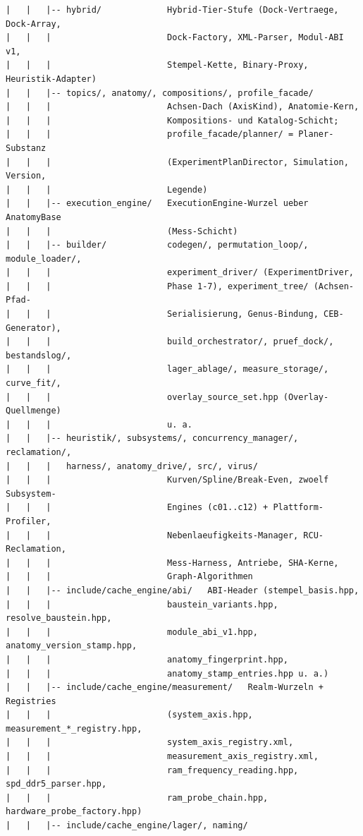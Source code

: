 {\begin{verbatim}
|   |   |-- hybrid/             Hybrid-Tier-Stufe (Dock-Vertraege, Dock-Array,
|   |   |                       Dock-Factory, XML-Parser, Modul-ABI v1,
|   |   |                       Stempel-Kette, Binary-Proxy, Heuristik-Adapter)
|   |   |-- topics/, anatomy/, compositions/, profile_facade/
|   |   |                       Achsen-Dach (AxisKind), Anatomie-Kern,
|   |   |                       Kompositions- und Katalog-Schicht;
|   |   |                       profile_facade/planner/ = Planer-Substanz
|   |   |                       (ExperimentPlanDirector, Simulation, Version,
|   |   |                       Legende)
|   |   |-- execution_engine/   ExecutionEngine-Wurzel ueber AnatomyBase
|   |   |                       (Mess-Schicht)
|   |   |-- builder/            codegen/, permutation_loop/, module_loader/,
|   |   |                       experiment_driver/ (ExperimentDriver,
|   |   |                       Phase 1-7), experiment_tree/ (Achsen-Pfad-
|   |   |                       Serialisierung, Genus-Bindung, CEB-Generator),
|   |   |                       build_orchestrator/, pruef_dock/, bestandslog/,
|   |   |                       lager_ablage/, measure_storage/, curve_fit/,
|   |   |                       overlay_source_set.hpp (Overlay-Quellmenge)
|   |   |                       u. a.
|   |   |-- heuristik/, subsystems/, concurrency_manager/, reclamation/,
|   |   |   harness/, anatomy_drive/, src/, virus/
|   |   |                       Kurven/Spline/Break-Even, zwoelf Subsystem-
|   |   |                       Engines (c01..c12) + Plattform-Profiler,
|   |   |                       Nebenlaeufigkeits-Manager, RCU-Reclamation,
|   |   |                       Mess-Harness, Antriebe, SHA-Kerne,
|   |   |                       Graph-Algorithmen
|   |   |-- include/cache_engine/abi/   ABI-Header (stempel_basis.hpp,
|   |   |                       baustein_variants.hpp, resolve_baustein.hpp,
|   |   |                       module_abi_v1.hpp, anatomy_version_stamp.hpp,
|   |   |                       anatomy_fingerprint.hpp,
|   |   |                       anatomy_stamp_entries.hpp u. a.)
|   |   |-- include/cache_engine/measurement/   Realm-Wurzeln + Registries
|   |   |                       (system_axis.hpp, measurement_*_registry.hpp,
|   |   |                       system_axis_registry.xml,
|   |   |                       measurement_axis_registry.xml,
|   |   |                       ram_frequency_reading.hpp, spd_ddr5_parser.hpp,
|   |   |                       ram_probe_chain.hpp, hardware_probe_factory.hpp)
|   |   |-- include/cache_engine/lager/, naming/

\end{verbatim}}
